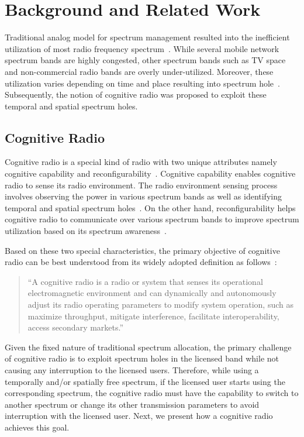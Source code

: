 \chapter{Background and Related Work}\label{relatedWork}

Traditional analog model for spectrum management resulted into the inefficient utilization of most radio frequency spectrum~\cite{valenta2010survey}. While several mobile network spectrum bands are highly congested, other spectrum bands such as TV space and non-commercial radio bands are overly under-utilized. Moreover, these utilization varies depending on time and place resulting into spectrum hole~\cite{tandra2009spectrum}. Subsequently, the notion of cognitive radio was proposed to exploit these temporal and spatial spectrum holes.

\section{Cognitive Radio}
Cognitive radio is a special kind of radio with two unique attributes namely cognitive capability and reconfigurability~\cite{akyildiz2006next, thomas2005cognitive, haykin2005cognitive}. Cognitive capability enables cognitive radio to sense its radio environment. The radio environment sensing process involves observing the power in various spectrum bands as well as identifying temporal and spatial spectrum holes~\cite{akyildiz2006next}. On the other hand, reconfigurability helps cognitive radio to communicate over various spectrum bands to improve spectrum utilization based on its spectrum awareness~\cite{jondral2005software}.

Based on these two special characteristics, the primary objective of cognitive radio can be best understood from its widely adopted definition as follows~\cite{federal2005notice}:

\begin{quote}
``A cognitive radio is a radio or system that senses its operational electromagnetic environment and can dynamically and autonomously adjust its radio operating parameters to modify system operation, such as maximize throughput, mitigate interference, facilitate interoperability, access secondary markets.''
\end{quote}

Given the fixed nature of traditional spectrum allocation, the primary challenge of cognitive radio is to exploit spectrum holes in the licensed band while not causing any interruption to the licensed users. Therefore, while using a temporally and/or spatially free spectrum, if the licensed user starts using the corresponding spectrum, the cognitive radio must have the capability to switch to another spectrum or change its other transmission parameters to avoid interruption with the licensed user. Next, we present how a cognitive radio achieves this goal.

